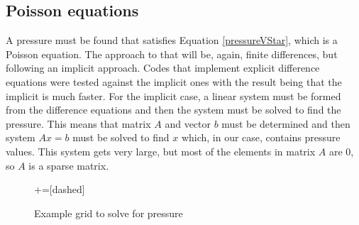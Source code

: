 \documentclass[journal]{IEEEtran}
\begin{document}
\subsection{Poisson equations}

A pressure must be found that satisfies Equation \ref{pressureVStar}, which is a Poisson equation. The approach to that will be, again, finite differences, but following an implicit approach. Codes that implement explicit difference equations were tested against the implicit ones with the result being that the implicit is much faster. For the implicit case, a linear system must be formed from the difference equations and then the system must be solved to find the pressure. This means that matrix $A$ and vector $b$ must be determined and then system $Ax = b$ must be solved to find $x$ which, in our case, contains pressure values. This system gets very large, but most of the elements in matrix $A$ are 0, so $A$ is a sparse matrix. 

\begin{figure}[!ht]
\centering
{}+=[dashed]%
\caption{Example grid to solve for pressure\label{examplePressureGrid}}
\end{figure}
\end{document}

